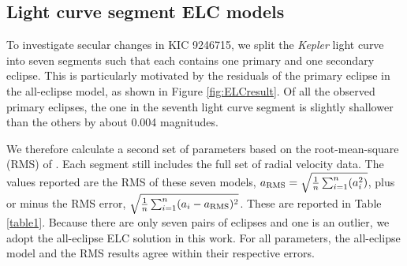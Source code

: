 \subsection{Light curve segment ELC models}\label{segment}
To investigate secular changes in KIC 9246715, we split the \emph{Kepler} light curve into seven segments such that each contains one primary and one secondary eclipse. This is particularly motivated by  the residuals of the primary eclipse in the all-eclipse model, as shown in Figure \ref{fig:ELCresult}. Of all the observed primary eclipses, the one in the seventh light curve segment is slightly shallower than the others by about 0.004 magnitudes. 

We therefore calculate a second set of parameters based on the root-mean-square (RMS) of . Each segment still includes the full set of radial velocity data. The values reported are the RMS of these seven models, $a_{\rm{RMS}} = \sqrt{\frac{1}{n} \sum_{i=1}^n (a_i^2)}$, plus or minus the RMS error, $\sqrt{\frac{1}{n} \sum_{i=1}^n (a_i - a_{\rm{RMS}})^2}$. These are reported in Table \ref{table1}.  Because there are only seven pairs of eclipses and one is an outlier, we adopt the all-eclipse ELC solution in this work. For all parameters, the all-eclipse model and the RMS results agree within their respective errors.
